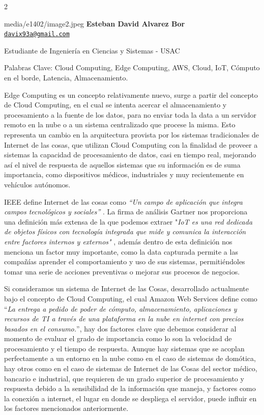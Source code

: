 \documentclass[12pt,spanish,Letterpaper,openany]{book}
\let\BeginKnitrBlock\begin \let\EndKnitrBlock\end
\begin{document}
\begin {multicols}{2}

\BeginKnitrBlock{photobiography3}{media/e1402/image2.jpeg}
\textbf{Esteban David Alvarez Bor}\\
\href{mailto:davix93a@gmail.com}{\nolinkurl{davix93a@gmail.com}}

\medskip

Estudiante de Ingeniería en Ciencias y Sistemas - USAC

\medskip

Palabras Clave: Cloud Computing, Edge Computing, AWS, Cloud, IoT, Cómputo en el borde, Latencia, Almacenamiento.
\EndKnitrBlock{photobiography3}

Edge Computing es un concepto relativamente nuevo, surge a partir del concepto de Cloud Computing, en el cual se intenta acercar el almacenamiento y procesamiento a la fuente de los datos, para no enviar toda la data a un servidor remoto en la nube o a un sistema centralizado que procese la misma. Esto representa un cambio en la arquitectura provista por los sistemas tradicionales de Internet de las cosas, que utilizan Cloud Computing con la finalidad de proveer a sistemas la capacidad de procesamiento de datos, casi en tiempo real, mejorando así el nivel de respuesta de aquellos sistemas que su información es de suma importancia, como dispositivos médicos, industriales y muy recientemente en vehículos autónomos.

IEEE define Internet de las cosas como \emph{``Un campo de aplicación que integra campos tecnológicos y sociales''} . La firma de análisis Gartner nos proporciona una definición más extensa de la que podemos extraer "\emph{IoT es una red dedicada de objetos físicos con tecnología integrada que mide y comunica la interacción entre factores internos y externos"} , además dentro de esta definición nos menciona un factor muy importante, como la data capturada permite a las compañías aprender el comportamiento y uso de sus sistemas, permitiéndoles tomar una serie de acciones preventivas o mejorar sus procesos de negocios.

Si consideramos un sistema de Internet de las Cosas, desarrollado actualmente bajo el concepto de Cloud Computing, el cual Amazon Web Services define como ``\emph{La entrega a pedido de poder de cómputo, almacenamiento, aplicaciones y recursos de TI a través de una plataforma en la nube en internet con precios basados en el consumo.}'', hay dos factores clave que debemos considerar al momento de evaluar el grado de importancia como lo son la velocidad de procesamiento y el tiempo de respuesta. Aunque hay sistemas que se acoplan perfectamente a un entorno en la nube como en el caso de sistemas de domótica, hay otros como en el caso de sistemas de Internet de las Cosas del sector médico, bancario e industrial, que requieren de un grado superior de procesamiento y respuesta debido a la sensibilidad de la información que maneja, y factores como la conexión a internet, el lugar en donde se despliega el servidor, puede influir en los factores mencionados anteriormente.


\end{multicols}
\end{document}
